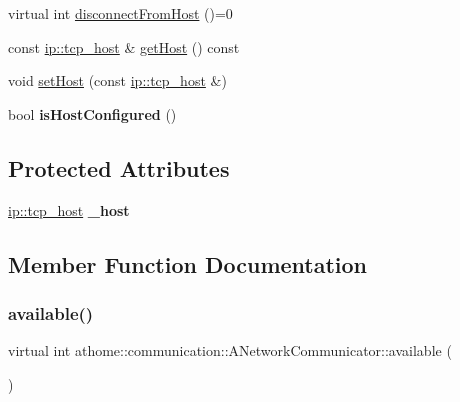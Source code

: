 \begin{DoxyCompactItemize}
\item 
virtual int \mbox{\hyperlink{classathome_1_1communication_1_1_a_network_communicator_a025b7fbe9b3c4452fcf1925d766324eb}{disconnect\+From\+Host}} ()=0
\item 
const \mbox{\hyperlink{structathome_1_1communication_1_1ip_1_1s__host}{ip\+::tcp\+\_\+host}} \& \mbox{\hyperlink{classathome_1_1communication_1_1_a_network_communicator_a6b52a87191bef07e73ec1bbba0713080}{get\+Host}} () const
\item 
void \mbox{\hyperlink{classathome_1_1communication_1_1_a_network_communicator_a2c19d9918fc1d85d1768bfd0ae0bd4d4}{set\+Host}} (const \mbox{\hyperlink{structathome_1_1communication_1_1ip_1_1s__host}{ip\+::tcp\+\_\+host}} \&)
\item 
\mbox{\label{classathome_1_1communication_1_1_a_network_communicator_a86f8dec086713ed91c398e23c11a49ce}} 
bool {\bfseries is\+Host\+Configured} ()
\end{DoxyCompactItemize}
\subsection*{Protected Attributes}
\begin{DoxyCompactItemize}
\item 
\mbox{\label{classathome_1_1communication_1_1_a_network_communicator_ad7b22eedcb47003e1b79e8ec480da119}} 
\mbox{\hyperlink{structathome_1_1communication_1_1ip_1_1s__host}{ip\+::tcp\+\_\+host}} {\bfseries \+\_\+host}
\end{DoxyCompactItemize}


\subsection{Member Function Documentation}
\mbox{\label{classathome_1_1communication_1_1_a_network_communicator_a2bf367d03c98e8523fda71dd43ffa2fb}} 
\subsubsection{\texorpdfstring{available()}{available()}}
{\footnotesize\ttfamily virtual int athome\+::communication\+::\+A\+Network\+Communicator\+::available (\begin{DoxyParamCaption}{ }\end{DoxyParamCaption})\hspace{0.3cm}{\ttfamily [pure virtual]}}

